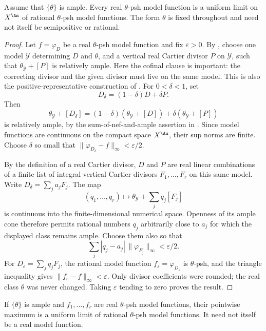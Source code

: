 \begin{lemma}
\label{lem:ch20-fixed-form-rational-approximation}
Assume that $\{\theta\}$ is ample.  Every real $\theta$-psh model
function is a uniform limit on $X^{\An}$ of rational $\theta$-psh model
functions.  The form $\theta$ is fixed throughout and need not itself be
semipositive or rational.
\end{lemma}

\begin{proof}
Let $f=\varphi_D$ be a real $\theta$-psh model function and fix
$\varepsilon>0$.  By
, choose one model $\mathcal Y$
determining $D$ and $\theta$, and a vertical real Cartier divisor
$P$ on $\mathcal Y$, such that $\theta_{\mathcal Y}+[P]$ is
relatively ample.  Here the cofinal clause is important: the correcting
divisor and the given divisor must live on the same model.  This is also
the positive-representative construction of
\cite[Proposition~5.2]{BFJ16}.  For $0<\delta<1$, set
\[
 D_\delta=(1-\delta)D+\delta P.
\]
Then
\[
 \theta_{\mathcal Y}+[D_\delta]
 =(1-\delta)(\theta_{\mathcal Y}+[D])
       +\delta(\theta_{\mathcal Y}+[P])
\]
is relatively ample, by the sum-of-nef-and-ample assertion in
.  Since model functions are continuous
on the compact space $X^{\An}$, their sup norms are finite.  Choose
$\delta$ so small that
$\|\varphi_{D_\delta}-f\|_\infty<\varepsilon/2$.

By the definition of a real Cartier divisor, $D$ and $P$ are real
linear combinations of a finite list of integral vertical Cartier divisors
$F_1,\ldots,F_r$ on this same model.  Write
$D_\delta=\sum_j a_jF_j$.  The map
\[
 (q_1,\ldots,q_r)\longmapsto
       \theta_{\mathcal Y}+\sum_jq_j[F_j]
\]
is continuous into the finite-dimensional numerical space.  Openness of
its ample cone therefore permits rational numbers $q_j$ arbitrarily
close to $a_j$ for which the displayed class remains ample.  Choose
them also so that
\[
 \sum_j|q_j-a_j|\,\|\varphi_{F_j}\|_\infty<\varepsilon/2.
\]
For $D_\varepsilon=\sum_jq_jF_j$, the rational model function
$f_\varepsilon=\varphi_{D_\varepsilon}$ is $\theta$-psh, and the
triangle inequality gives $\|f_\varepsilon-f\|_\infty<\varepsilon$.
Only divisor coefficients were rounded; the real class $\theta$ was
never changed.  Taking $\varepsilon$ tending to zero proves the result.
\end{proof}

\begin{corollary}
\label{cor:ch20-real-max-uniform-approximation}
If $\{\theta\}$ is ample and $f_1,\ldots,f_r$ are real
$\theta$-psh model functions, their pointwise maximum is a uniform
limit of rational $\theta$-psh model functions.  It need not itself
be a real model function.
\end{corollary}

